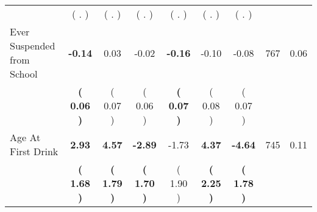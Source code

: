 \begin{tabular}{lcccccccc}
 & (        . ) & (        . ) & (        . ) & (        . ) & (        . ) & (        . ) & \\
Ever Suspended from School & \textbf{    -0.14} &      0.03 &     -0.02 & \textbf{    -0.16} &     -0.10 &     -0.08 & 767 &       0.06 \\ 
 & \textbf{(     0.06 )} & (     0.07 ) & (     0.06 ) & \textbf{(     0.07 )} & (     0.08 ) & (     0.07 ) & \\
Age At First Drink & \textbf{     2.93} & \textbf{     4.57} & \textbf{    -2.89} &     -1.73 & \textbf{     4.37} & \textbf{    -4.64} & 745 &       0.11 \\ 
 & \textbf{(     1.68 )} & \textbf{(     1.79 )} & \textbf{(     1.70 )} & (     1.90 ) & \textbf{(     2.25 )} & \textbf{(     1.78 )} & \\
\bottomrule
\end{tabular}
